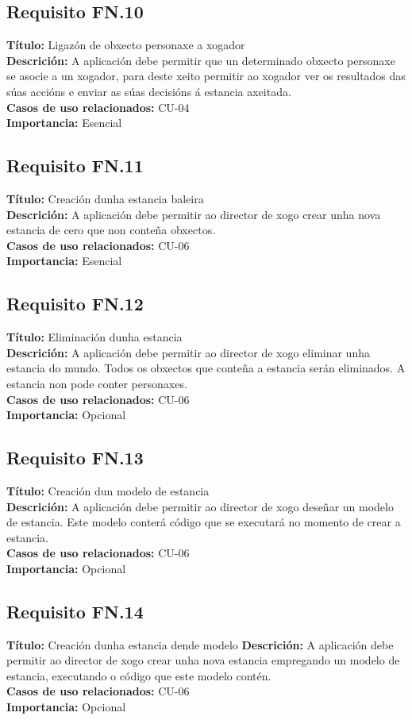 \subsection{Requisito FN.10}
{\bf Título:} Ligazón de obxecto personaxe a xogador\\
{\bf Descrición:} A aplicación debe permitir que un determinado obxecto personaxe se asocie a un xogador, para deste xeito permitir ao xogador ver os resultados das súas accións e enviar as súas decisións á estancia axeitada.\\
{\bf Casos de uso relacionados:} CU-04\\
{\bf Importancia:} Esencial

\subsection{Requisito FN.11}
{\bf Título:} Creación dunha estancia baleira\\
{\bf Descrición:} A aplicación debe permitir ao director de xogo crear unha nova estancia de cero que non conteña obxectos.\\
{\bf Casos de uso relacionados:} CU-06\\
{\bf Importancia:} Esencial

\subsection{Requisito FN.12}
{\bf Título:} Eliminación dunha estancia\\
{\bf Descrición:} A aplicación debe permitir ao director de xogo eliminar unha estancia do mundo. Todos os obxectos que conteña a estancia serán eliminados. A estancia non pode conter personaxes.\\
{\bf Casos de uso relacionados:} CU-06\\
{\bf Importancia:} Opcional

\subsection{Requisito FN.13}
{\bf Título:} Creación dun modelo de estancia\\
{\bf Descrición:} A aplicación debe permitir ao director de xogo deseñar un modelo de estancia. Este modelo conterá código que se executará no momento de crear a estancia.\\
{\bf Casos de uso relacionados:} CU-06\\
{\bf Importancia:} Opcional

\subsection{Requisito FN.14}
{\bf Título:} Creación dunha estancia dende modelo
{\bf Descrición:} A aplicación debe permitir ao director de xogo crear unha nova estancia empregando un modelo de estancia, executando o código que este modelo contén.\\
{\bf Casos de uso relacionados:} CU-06\\
{\bf Importancia:} Opcional

